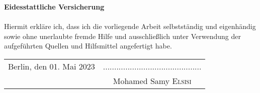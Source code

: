 \begin{titlepage}
\vspace*{5.0cm}
\large{\bf Eidesstattliche Versicherung}\\
\\
Hiermit erkl\"are ich, dass ich die vorliegende Arbeit selbstst\"andig und eigenh\"andig sowie ohne unerlaubte fremde Hilfe und ausschlie\ss lich unter Verwendung der aufgef\"uhrten Quellen und Hilfsmittel angefertigt habe.
\vspace*{1cm}
~\\
\begin{tabular}{lc}
      \vspace*{0.1cm}
      \noindent Berlin, den 01. Mai 2023 & \noindent ............................................ \\
      \vspace*{0.1cm}
					      & \noindent \large{Mohamed Samy \textsc{Elsisi}}
\end{tabular}


\end{titlepage}
\sloppy

\titlepage
